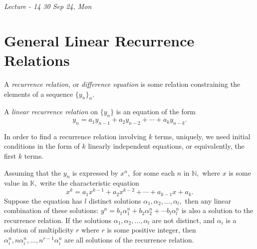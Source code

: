 
\noindent
\emph{Lecture - 14 \hfill 30 Sep 24, Mon}

\section{General Linear Recurrence Relations}

\begin{definition}
	A \emph{recurrence relation,} or \emph{difference equation} is some relation constraining the elements of a sequence $\{ y_n \}_n.$
\end{definition}

A \emph{linear recurrence relation} on $\{ y_n \}$ is an equation
of the form 
$$ y_n = a_1 y_{n-1} + a_2 y_{n-2} + \cdots + a_k y_{n-k}.$$

\begin{remark}
	In order to find a recurrence relation involving $k$ terms, uniquely, we need
	initial conditions in the form of $k$ linearly independent
	equations, or equivalently, the first $k$ terms.
\end{remark}

Assuming that the $y_n$ is expressed by $x^n,$ for some each $n$ in 
$\mathbb{N},$ where $x$ is some value in $\mathbb{K},$
write the characteristic equation 
$$x^k = a_1 x^{k-1} + a_2 x^{k-2} + \cdots + a_{k-1} x + a_k.$$
Suppose the equation has $l$ distinct solutions $\alpha_1, \alpha_2,
\dotsc, \alpha_l,$ then any linear combination of these solutions:
$y^n = b_1 \alpha_1^n + b_2 \alpha_2^n + \cdots b_l \alpha_l^n$ is 
also a solution to the recurrence relation.
If the solutions $\alpha_1, \alpha_2, \dotsc, \alpha_l$ are not
distinct, and $\alpha_i$ is a solution of multiplicity $r$ where 
$r$ is some positive integer, then $\alpha_i^n, n \alpha_i^n, \dotsc,
n^{r-1} \alpha_i^n$ are all solutions of the recurrence relation.

